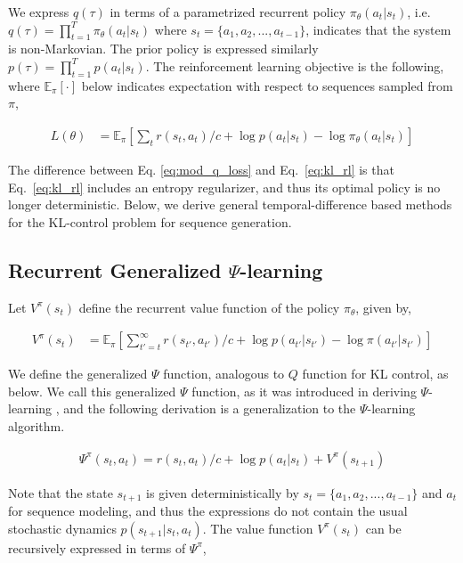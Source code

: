 We express $q(\tau)$ in terms of a parametrized recurrent policy $\pi_\theta(a_t|s_t)$, i.e.~$q(\tau)=\prod_{t=1}^T \pi_\theta(a_t|s_t)$  where $s_t=\{a_1,a_2,...,a_{t-1}\}$, indicates that the system is non-Markovian. The prior policy is expressed similarly $p(\tau)=\prod_{t=1}^Tp(a_t|s_t)$. The reinforcement learning objective is the following, where $\mathbb{E}_{\pi}[\cdot]$ below indicates expectation with respect to sequences sampled from $\pi$,

\begin{align}
\label{eq:kl_rl}
L(\theta) &= \mathbb{E}_{\pi}[\sum_t r(s_t,a_t)/c + \log p(a_t|s_t) - \log\pi_\theta(a_t|s_t)] 
\end{align}

The difference between Eq. \ref{eq:mod_q_loss} and Eq.~\ref{eq:kl_rl} is that Eq.~\ref{eq:kl_rl} includes an entropy regularizer, and thus its optimal policy is no longer deterministic. Below, we derive general temporal-difference based methods for the KL-control problem for sequence generation. 

\subsection{Recurrent Generalized $\Psi$-learning}
\label{sec:gen-psi-learning}
Let $V^\pi(s_t)$ define the recurrent value function of the policy $\pi_\theta$, given by,

\begin{align} 
\label{eq:vfunv}
 V^\pi(s_t) &= \mathbb{E}_{\pi}[\sum_{t'=t}^\infty r(s_{t'},a_{t'})/c 

 + \log p(a_{t'}|s_{t'}) - \log \pi(a_{t'}|s_{t'})
 ] \nonumber
\end{align}

We define the generalized $\Psi$ function, analogous to $Q$ function for KL control, as below. We call this generalized $\Psi$ function, as it was introduced in deriving $\Psi$-learning \cite{rawlik2012stochastic}, and the following derivation is a generalization to the $\Psi$-learning algorithm.

\begin{equation}
\begin{split}
\label{eq:psifunc1}
\Psi^\pi(s_t,a_t) 

= r(s_t,a_t)/c+\log p(a_t|s_t) + V^\pi(s_{t+1})
\end{split}
\end{equation}

Note that the state $s_{t+1}$ is given deterministically by $s_t=\{a_1,a_2,...,a_{t-1}\}$ and $a_t$ for sequence modeling, and thus the expressions do not contain the usual stochastic dynamics $p(s_{t+1}|s_t,a_t)$. The value function $V^\pi(s_t)$  can be recursively expressed in terms of $\Psi^\pi$,

